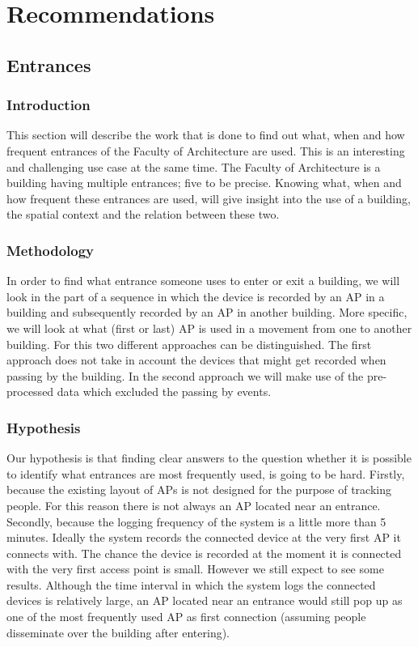 \chapter{Recommendations}
\section{Entrances}
\subsection{Introduction}\label{intro}
This section will describe the work that is done to find out what, when and how frequent entrances of the Faculty of Architecture are used. This is an interesting and challenging use case at the same time. The Faculty of Architecture is a building having multiple entrances; five to be precise. Knowing what, when and how frequent these entrances are used, will give insight into the use of a building, the spatial context and the relation between these two.
\subsection{Methodology}\label{method}
In order to find what entrance someone uses to enter or exit a building, we will look in the part of a sequence in which the device is recorded by an AP in a building and subsequently recorded by an AP in another building. More specific, we will look at what (first or last) AP is used in a movement from one to another building. For this two different approaches can be distinguished. The first approach does not take in account the devices that might get recorded when passing by the building. In  the second approach we will make use of the pre-processed data which excluded the passing by events.
\subsection{Hypothesis}\label{hypo}
Our hypothesis is that finding clear answers to the question whether it is possible to identify what entrances are most frequently used, is going to be hard. Firstly, because the existing layout of APs is not designed for the purpose of tracking people. For this reason there is not always an AP located near an entrance. Secondly, because the logging frequency of the system is a little more than 5 minutes. Ideally the system records the connected device at the very first AP it connects with. The chance the device is recorded at the moment it is connected with the very first access point is small. However we still expect to see some results. Although the time interval in which the system logs the connected devices is relatively large, an AP located near an entrance would still pop up as one of the most frequently used AP as first connection (assuming people disseminate over the building after entering). 
